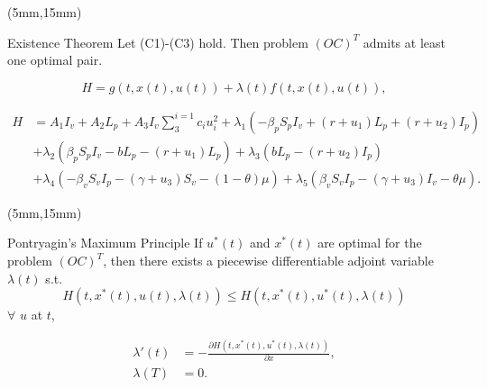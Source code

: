 \begin{frame}
	\begin{textblock*}{120mm}(5mm,15mm)
		\begin{graybox}{Existence Theorem}
			Let (C1)-(C3) hold. Then problem $(OC)^T$ admits at least one optimal pair.
		\end{graybox}
	\end{textblock*}
\end{frame}

\begin{frame}
	\begin{equation*}
		H=g(t,x(t),u(t))+\lambda(t)f(t,x(t),u(t)),
	\end{equation*}
	
	\begin{align*}
	H&=A_1I_v+A_2L_p+A_3I_v\sum_{3}^{i=1}c_iu_i^2
	+\lambda_1(-\beta_p S_p I_v +(r +u_1)L_p + (r + u_2) I_p)\\
	&+\lambda_2(\beta_p S_p I_v -b L_p -(r + u_1)L_p)
	+\lambda_3(b L_p - (r + u_2) I_p)\\
	&+\lambda_4(-\beta_v S_v I_p - (\gamma+u_3) S_v -(1-\theta)\mu)
	+\lambda_5(\beta_v S_v I_p -(\gamma+u_3) I_v -\theta\mu).
	\end{align*}
	
\end{frame}
\begin{frame}
	\begin{textblock*}{120mm}(5mm,15mm)
		\begin{graybox}{Pontryagin’s Maximum Principle}
			If $u^*(t)$ and $x^*(t)$ are optimal for the problem $(OC)^T$, then there exists a piecewise differentiable adjoint variable $\lambda(t)$ s.t.
				\begin{equation*}
					H(t,x^*(t),u(t),\lambda(t))\leq H(t,x^*(t),u^*(t),\lambda(t))
				\end{equation*}
			$\forall$ $u$ at $t$,

				\begin{align*}
					\lambda'(t) &= -\frac{\partial H(t,x^*(t),u^*(t),\lambda(t))}{\partial x},\\
					\lambda(T) &= 0.
				\end{align*}
		\end{graybox}
		
	\end{textblock*}
	
\end{frame}

